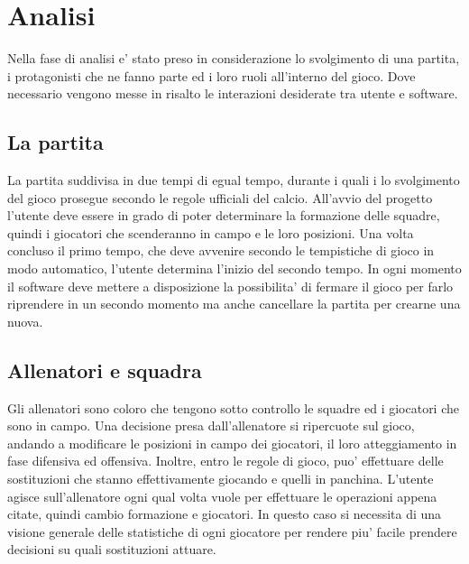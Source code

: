 
\section{Analisi}
\label{sec:analisi}

Nella fase di analisi e' stato preso in considerazione lo svolgimento di una partita, i protagonisti che ne fanno parte ed i loro ruoli all'interno del gioco. Dove necessario vengono messe in risalto le interazioni desiderate tra utente e software.

\subsection{La partita}
\label{sec:entita_giocatori}

La partita suddivisa in due tempi di egual tempo, durante i quali i lo svolgimento del gioco prosegue secondo le regole ufficiali del calcio. All'avvio del progetto l'utente deve essere in grado di poter determinare la formazione delle squadre, quindi i giocatori che scenderanno in campo e le loro posizioni. Una volta concluso il primo tempo, che deve avvenire secondo le tempistiche di gioco in modo automatico, l'utente determina l'inizio del secondo tempo. In ogni momento il software deve mettere a disposizione la possibilita' di fermare il gioco per farlo riprendere in un secondo momento ma anche cancellare la partita per crearne una nuova.

\subsection{Allenatori e squadra}
\label{sec:entita_giocatori}

Gli allenatori sono coloro che tengono sotto controllo le squadre ed i giocatori che sono in campo. Una decisione presa dall'allenatore si ripercuote sul gioco, andando a modificare le posizioni in campo dei giocatori, il loro atteggiamento in fase difensiva ed offensiva. Inoltre, entro le regole di gioco, puo' effettuare delle sostituzioni che stanno effettivamente giocando e quelli in panchina. L'utente agisce sull'allenatore ogni qual volta vuole per effettuare le operazioni appena citate, quindi cambio formazione e giocatori. In questo caso si necessita di una visione generale delle statistiche di ogni giocatore per rendere piu' facile prendere decisioni su quali sostituzioni attuare.

